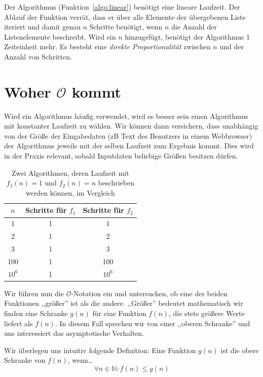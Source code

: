 Der Algorithmus (Funktion~\ref{algo:linear}) benötigt eine lineare Laufzeit. Der Ablauf der Funktion verrät, dass er über alle Elemente der übergebenen Liste iteriert und damit genau $n$ Schritte benötigt, wenn $n$ die Anzahl der Listenelemente beschreibt. Wird ein $n$ hinzugefügt, benötigt der Algorithmus 1 Zeiteinheit mehr. Es besteht eine \emph{direkte Proportionalität} zwischen $n$ und der Anzahl von Schritten.

\section{Woher $\mathcal{O}$ kommt}
%
Wird ein Algorithmus häufig verwendet, wird es besser sein einen Algorithmus mit konstanter Laufzeit zu wählen. Wir können dann versichern, dass unabhängig von der Größe der Eingabedaten (zB Text des Benutzers in einem Webbrowser) der Algorithmus jeweils mit der selben Laufzeit zum Ergebnis kommt. Dies wird in der Praxis relevant, sobald Inputdaten beliebige Größen besitzen dürfen.
%
\begin{table}
 \begin{center}
  \begin{tabular}{ccc}
   $n$ & Schritte für $f_1$ & Schritte für $f_2$ \\
  \hline
   1  & 1                  & 1 \\
   2  & 1                  & 2 \\
   3  & 1                  & 3 \\
   100 & 1                 & 100 \\
   $10^6$ & 1              & $10^6$ \\
 \hline
  \end{tabular}
  \caption{Zwei Algorithmen, deren Laufzeit mit $f_1(n) = 1$ und $f_2(n) = n$ beschrieben werden können, im Vergleich}
 \end{center}
\end{table}

Wir führen nun die $\mathcal{O}$-Notation ein und untersuchen, ob eine der beiden Funktionen ,,größer'' ist als die andere. ,,Größer'' bedeutet mathematisch wir finden eine Schranke $g(n)$ für eine Funktion $f(n)$, die stets größere Werte liefert als $f(n)$. In diesem Fall sprechen wir von einer ,,oberen Schranke'' und uns interessiert das asymptotische Verhalten.

Wir überlegen uns intuitiv folgende Definition: Eine Funktion $g(n)$ ist die obere Schranke von $f(n)$, wenn\dots
\[
  \forall n \in \mathbb{N}: f(n) \leq g(n)
\]


